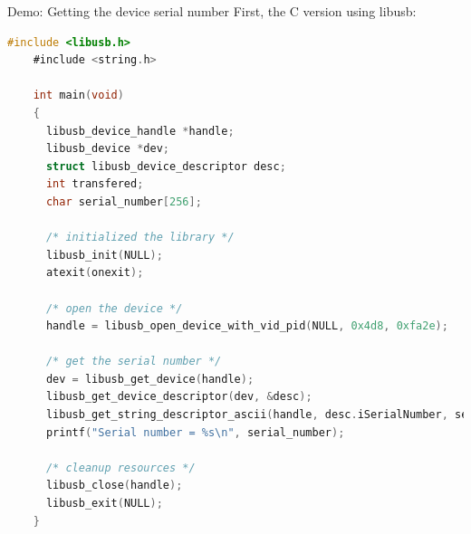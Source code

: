 \documentclass[pdf]{beamer}
\begin{document}
\begin{frame}[fragile]{Demo: Getting the device serial number}
  \tiny
  \pause
  First, the C version using libusb:
  \pause
  \begin{lstlisting}[language=C]
    #include <libusb.h>
    #include <string.h>

    int main(void)
    {
      libusb_device_handle *handle;
      libusb_device *dev;
      struct libusb_device_descriptor desc;
      int transfered;
      char serial_number[256];

      /* initialized the library */
      libusb_init(NULL);
      atexit(onexit);

      /* open the device */
      handle = libusb_open_device_with_vid_pid(NULL, 0x4d8, 0xfa2e);

      /* get the serial number */
      dev = libusb_get_device(handle);
      libusb_get_device_descriptor(dev, &desc);
      libusb_get_string_descriptor_ascii(handle, desc.iSerialNumber, serial_number, 256);
      printf("Serial number = %s\n", serial_number);

      /* cleanup resources */
      libusb_close(handle);
      libusb_exit(NULL);
    }
  \end{lstlisting}
\end{frame}
\end{document}
